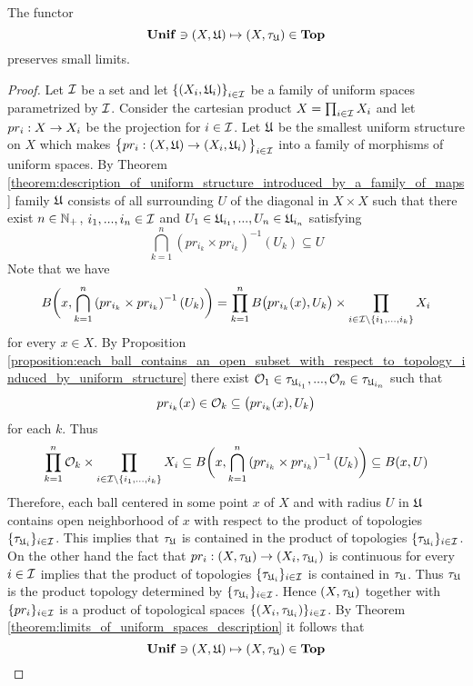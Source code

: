 \begin{theorem}\label{theorem:limits_of_uniform_spaces_description}
The functor 
$$\mathbf{Unif} \ni (X,{\mathfrak U}) \mapsto (X,\tau_{{\mathfrak U}}) \in \mathbf{Top}$$
preserves small limits.
\end{theorem}
\begin{proof}
Let ${\mathcal I}$ be a set and let $\left\{\left(X_i,{\mathfrak U}_i\right)\right\}_{i\in {\mathcal I}}$ be a family of uniform spaces parametrized by ${\mathcal I}$. Consider the cartesian product $X = \prod_{i\in {\mathcal I}}X_i$ and let $pr_i:X\rightarrow X_i$ be the projection for $i\in {\mathcal I}$. Let ${\mathfrak U}$ be the smallest uniform structure on $X$ which makes $\big\{pr_i:\left(X,{\mathfrak U}\right) \rightarrow \left(X_i,{\mathfrak U}_i\right)\big\}_{i\in {\mathcal I}}$ into a family of morphisms of uniform spaces. By Theorem \ref{theorem:description_of_uniform_structure_introduced_by_a_family_of_maps} family ${\mathfrak U}$ consists of all surrounding $U$ of the diagonal in $X\times X$ such that there exist $n\in {\mathbb N}_+$, $i_1,...,i_n\in {\mathcal I}$ and $U_1 \in {\mathfrak U}_{i_1},...,U_n\in {\mathfrak U}_{i_n}$ satisfying
$$\bigcap_{k=1}^n\left(pr_{i_k}\times pr_{i_k}\right)^{-1}(U_k) \subseteq U$$
Note that we have
$$B\bigg(x, \bigcap_{k=1}^n\left(pr_{i_k}\times pr_{i_k}\right)^{-1}(U_k)\bigg) = \prod_{k=1}^nB\big(pr_{i_k}(x), U_k\big)\times \prod_{i\in {\mathcal I}\setminus \{i_1,...,i_k\}}X_i$$
for every $x \in X$. By Proposition \ref{proposition:each_ball_contains_an_open_subset_with_respect_to_topology_induced_by_uniform_structure} there exist ${\mathcal O}_1 \in \tau_{{\mathfrak U}_{i_1}},...,{\mathcal O}_n \in \tau_{{\mathfrak U}_{i_n}}$ such that 
$$pr_{i_k}(x) \in {\mathcal O}_k \subseteq \big(pr_{i_k}(x), U_k\big)$$
for each $k$. Thus
$$\prod_{k=1}^n{\mathcal O}_k \times \prod_{i\in {\mathcal I}\setminus \{i_1,...,i_k\}}X_i \subseteq B\bigg(x, \bigcap_{k=1}^n\left(pr_{i_k}\times pr_{i_k}\right)^{-1}(U_k)\bigg) \subseteq B(x,U)$$
Therefore, each ball centered in some point $x$ of $X$ and with radius $U$ in ${\mathfrak U}$ contains open neighborhood of $x$ with respect to the product of topologies $\{\tau_{{\mathfrak U}_i}\}_{i\in  {\mathcal I}}$. This implies that $\tau_{{\mathfrak U}}$ is contained in the product of topologies $\{\tau_{{\mathfrak U}_i}\}_{i\in  {\mathcal I}}$. On the other hand the fact that $pr_i:(X,\tau_{{\mathfrak U}}) \rightarrow (X_i,\tau_{{\mathfrak U}_i})$ is continuous for every $i\in {\mathcal I}$ implies that the product of topologies $\{\tau_{{\mathfrak U}_i}\}_{i\in {\mathcal I}}$ is contained in $\tau_{{\mathfrak U}}$. Thus $\tau_{{\mathfrak U}}$ is the product topology determined by $\{\tau_{{\mathfrak U}_i}\}_{i\in {\mathcal I}}$. Hence $(X,\tau_{{\mathfrak U}})$ together with $\{pr_i\}_{i\in {\mathcal I}}$ is a product of topological spaces $\{(X_i,\tau_{{\mathfrak U}_i})\}_{i\in {\mathcal I}}$. By Theorem \ref{theorem:limits_of_uniform_spaces_description} it follows that
$$\mathbf{Unif} \ni (X,{\mathfrak U}) \mapsto (X,\tau_{{\mathfrak U}}) \in \mathbf{Top}$$

\end{proof}
